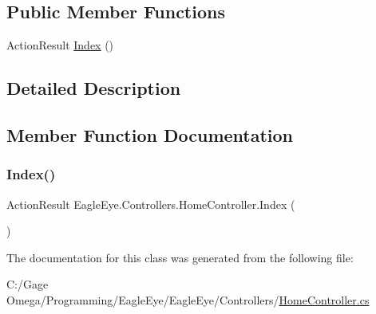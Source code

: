 \subsection*{Public Member Functions}
\begin{DoxyCompactItemize}
\item 
Action\+Result \mbox{\hyperlink{class_eagle_eye_1_1_controllers_1_1_home_controller_a514cfcd727b9415f4918ee62072b1259}{Index}} ()
\end{DoxyCompactItemize}


\subsection{Detailed Description}




\subsection{Member Function Documentation}
\mbox{\label{class_eagle_eye_1_1_controllers_1_1_home_controller_a514cfcd727b9415f4918ee62072b1259}} 
\subsubsection{\texorpdfstring{Index()}{Index()}}
{\footnotesize\ttfamily Action\+Result Eagle\+Eye.\+Controllers.\+Home\+Controller.\+Index (\begin{DoxyParamCaption}{ }\end{DoxyParamCaption})}







The documentation for this class was generated from the following file\+:\begin{DoxyCompactItemize}
\item 
C\+:/\+Gage Omega/\+Programming/\+Eagle\+Eye/\+Eagle\+Eye/\+Controllers/\mbox{\hyperlink{_home_controller_8cs}{Home\+Controller.\+cs}}\end{DoxyCompactItemize}
